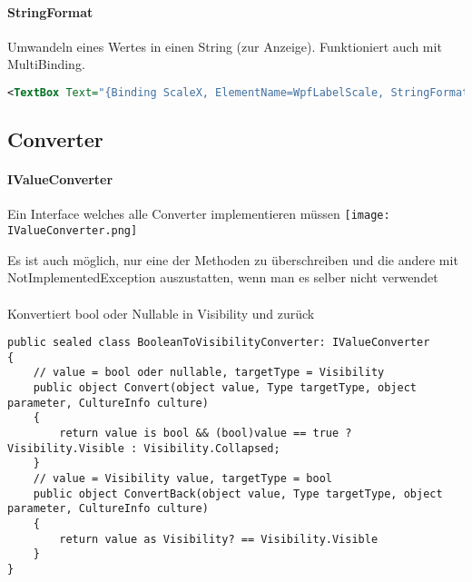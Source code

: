 \paragraph{StringFormat}
Umwandeln eines Wertes in einen String (zur Anzeige). Funktioniert auch mit MultiBinding.
\begin{lstlisting}[language=xml]
<TextBox Text="{Binding ScaleX, ElementName=WpfLabelScale, StringFormat={}{0:0.0}}" /> 
\end{lstlisting}

\subsection{Converter}
\paragraph{IValueConverter} Ein Interface welches alle Converter implementieren müssen
\texttt{[image: IValueConverter.png]}

Es ist auch möglich, nur eine der Methoden zu überschreiben und die andere mit NotImplementedException auszustatten, wenn man es selber nicht verwendet \\
\\
Konvertiert bool oder Nullable in Visibility und zurück
\begin{lstlisting}
public sealed class BooleanToVisibilityConverter: IValueConverter
{
    // value = bool oder nullable, targetType = Visibility
    public object Convert(object value, Type targetType, object parameter, CultureInfo culture)
    {
        return value is bool && (bool)value == true ? Visibility.Visible : Visibility.Collapsed;
    }
    // value = Visibility value, targetType = bool
    public object ConvertBack(object value, Type targetType, object parameter, CultureInfo culture)
    {
        return value as Visibility? == Visibility.Visible
    }
}
\end{lstlisting}

